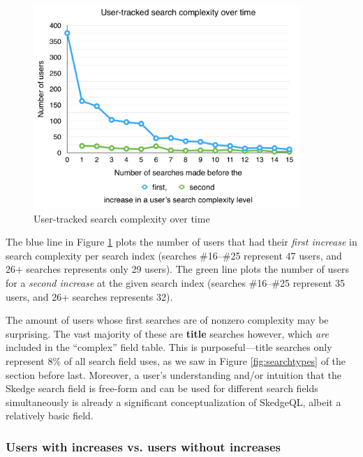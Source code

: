 {\begin{figure}[H]
  \centering
  \includegraphics[width=0.9\textwidth]{images/graph/search_dt}
  
  \caption{User-tracked search complexity over time}
  \label{fig:sc-graph}
\end{figure}

The blue line in Figure \ref{fig:sc-graph} plots the number of users that had their \emph{first increase} in search complexity per search index (searches \#16--\#25 represent 47 users, and 26+ searches represents only 29 users). The green line plots the number of users for a \emph{second increase} at the given search index (searches \#16--\#25 represent 35 users, and 26+ searches represents 32).

The amount of users whose first searches are of nonzero complexity may be surprising. The vast majority of these are \textbf{title} searches however, which \emph{are} included in the ``complex'' field table. This is purposeful---title searches only represent 8\% of all search field uses, as we saw in Figure \ref{fig:searchtypes} of the section before last. Moreover, a user's understanding and/or intuition that the Skedge search field is free-form and can be used for different search fields simultaneously is already a significant conceptualization of SkedgeQL, albeit a relatively basic field.

\subsubsection{Users with increases vs. users without increases}

}
